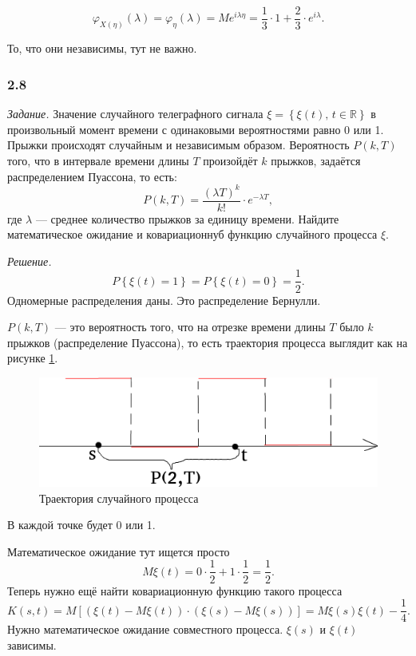 $$ \varphi_{X \left( \eta \right) } \left( \lambda \right) =
  \varphi_{ \eta } \left( \lambda \right) =
  Me^{i \lambda \eta } =
  \frac{1}{3} \cdot 1 + \frac{2}{3} \cdot e^{i \lambda }.$$

То, что они независимы, тут не важно.

\subsubsection*{2.8}

\textit{Задание.}
Значение случайного телеграфного сигнала
$ \xi = \left\{ \xi \left( t \right) , \,
  t \in \mathbb{R} \right\} $
в произвольный момент времени с одинаковыми вероятностями равно 0 или 1.
Прыжки происходят случайным и независимым образом.
Вероятность $P \left( k, T \right) $ того, что в интервале времени длины $T$ произойдёт $k$ прыжков,
задаётся распределением Пуассона, то есть:
$$P \left( k, T \right) =
  \frac{ \left( \lambda T \right)^k}{k!} \cdot e^{-\lambda T},$$
где $ \lambda $ --- среднее количество прыжков за единицу времени.
Найдите математическое ожидание и ковариационнуб функцию случайного процесса $ \xi $.

\textit{Решение.}
$$P \left\{ \xi \left( t \right) = 1 \right\} =
  P \left\{ \xi \left( t \right) = 0 \right\} =
  \frac{1}{2}.$$
Одномерные распределения даны.
Это распределение Бернулли.

$P \left( k, T \right) $ --- это вероятность того,
что на отрезке времени длины $T$ было $k$ прыжков (распределение Пуассона),
то есть траектория процесса выглядит как на рисунке \ref{fig:28}.

\begin{figure}[h!]
 \centering
 \includegraphics[width=.5\textwidth]{./pictures/2_8.png}
 \caption{Траектория случайного процесса}
 \label{fig:28}
\end{figure}

В каждой точке будет 0 или 1.

Математическое ожидание тут ищется просто
$$M \xi \left( t \right) =
  0 \cdot \frac{1}{2} + 1 \cdot \frac{1}{2} =
  \frac{1}{2}.$$
Теперь нужно ещё найти ковариационную функцию такого процесса
$$K \left( s, t \right) =
  M \left[
    \left( \xi \left( t \right) - M \xi \left( t \right) \right) \cdot
    \left( \xi \left( s \right) - M \xi \left( s \right) \right) \right] =
  M \xi \left( s \right) \xi \left( t \right) - \frac{1}{4}.$$
Нужно математическое ожидание совместного процесса.
$ \xi \left( s \right) $ и $ \xi \left( t \right) $ зависимы.

